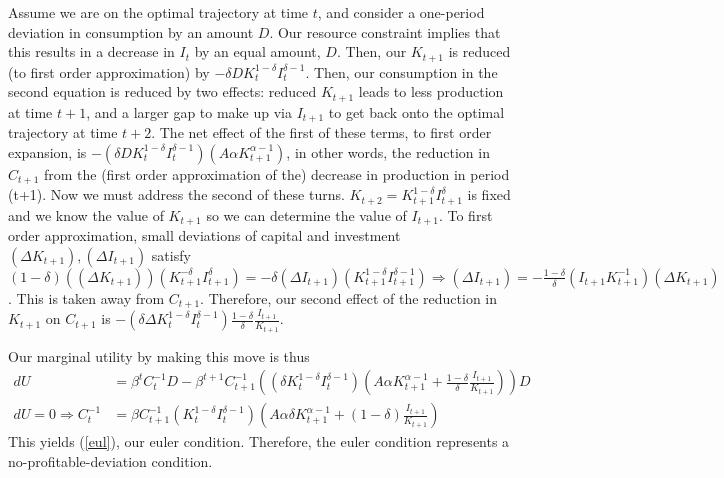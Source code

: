 \documentclass[11pt]{article} %
\begin{document}
Assume we are on the optimal trajectory at time $t$, and consider a one-period deviation in consumption by an amount $D$. Our resource constraint implies that this results in a decrease in $I_t$ by an equal amount, $D$. Then, our $K_{t+1}$ is reduced (to first order approximation) by $ -\delta D K_t^{1-\delta}I_t^{\delta-1}$. Then, our consumption in the second equation is reduced by two effects: reduced $K_{t+1}$ leads to less production at time $t+1$, and a larger gap to make up via $I_{t+1}$ to get back onto the optimal trajectory at time $t+2$. The net effect of the first of these terms, to first order expansion, is $-(\delta D  K_t^{1-\delta}I_t^{\delta-1})(A\alpha K_{t+1}^{\alpha - 1} ) $, in other words, the reduction in $C_{t+1}$ from the (first order approximation of the) decrease in production in period (t+1). Now we must address the second of these turns. $K_{t+2} = K_{t+1}^{1-\delta}I_{t+1}^{\delta}$ is fixed and we know the value of $K_{t+1}$ so we can determine the value of $I_{t+1}.$ To first order approximation, small deviations of capital and investment $(\Delta K_{t+1}),(\Delta I_{t+1})$ satisfy $(1-\delta)((\Delta K_{t+1}))(K_{t+1}^{-\delta}I_{t+1}^{\delta}) = -\delta (\Delta I_{t+1})(K_{t+1}^{1-\delta}I_{t+1}^{\delta - 1}) \Rightarrow (\Delta I_{t+1}) =- \frac{1-\delta}{\delta}(I_{t+1}K_{t+1}^{-1})(\Delta K_{t+1})$. This is taken away from $C_{t+1}.$ Therefore, our second effect of the reduction in $K_{t+1}$ on $C_{t+1}$ is $-(\delta \Delta  K_t^{1-\delta}I_t^{\delta-1})\frac{1-\delta}{\delta}\frac{I_{t+1}}{K_{t+1}}$.

Our marginal utility by making this move is thus 
\begin{align*}
dU &=  \beta^tC_t^{-1}D - \beta^{t+1} C_{t+1}^{-1}\left((\delta K_t^{1-\delta}I_t^{\delta-1})\left(A\alpha K_{t+1}^{\alpha - 1} + \frac{1-\delta}{\delta}\frac{I_{t+1}}{K_{t+1}} \right) \right)D\\
dU = 0 \Rightarrow C_t^{-1} &= \beta C_{t+1}^{-1}( K_t^{1-\delta}I_t^{\delta-1})\left(A\alpha \delta K_{t+1}^{\alpha - 1} + (1-\delta)\frac{I_{t+1}}{K_{t+1}} \right)
\end{align*}
This yields (\ref{eul}), our euler condition. Therefore, the euler condition represents a no-profitable-deviation condition.
\end{document}

